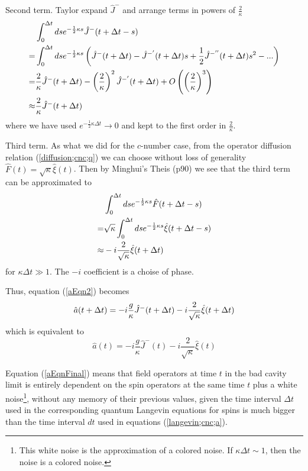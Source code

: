\documentclass{article}
\begin{document}
Second term. Taylor expand $\hat{J}^-$ and arrange terms in powers of $\frac{2}{\kappa}$
\begin{align}
\label{jMinusEli}
    \notag &\int_0^{\Delta t} ds e^{-\frac{1}{2}\kappa s}\hat{J}^-(t+\Delta t-s)\\
    \notag=&\int_0^{\Delta t} ds e^{-\frac{1}{2}\kappa s}\left(\hat{J}^-(t+\Delta t)-\hat{J}^{-'}(t+\Delta t)s+\frac{1}{2}\hat{J}^{-''}(t+\Delta t)s^2-...\right)\\
    \notag=&\frac{2}{\kappa}\hat{J}^-(t+\Delta t)-\left(\frac{2}{\kappa}\right)^2\hat{J}^{-'}(t+\Delta t)+O\left(\left(\frac{2}{\kappa}\right)^3\right)\\
          \approx&\frac{2}{\kappa}\hat{J}^-(t+\Delta t)
\end{align}
where we have used $e^{-\frac{1}{2}\kappa \Delta t}\rightarrow 0$ and kept to the first order in $\frac{2}{\kappa}$.

Third term. As what we did for the $c$-number case, from the operator diffusion relation (\ref{diffusion;cnc;q}) we can choose without loss of generality $\hat{F}(t) = \sqrt{\kappa}\hat{\xi}(t)$. Then by Minghui's Theis (p90) we see that the third term can be approximated to
\begin{align}
    \notag &\int_0^{\Delta t} ds e^{-\frac{1}{2}\kappa s} \hat{F}(t+\Delta t-s)\\
    \notag=&\sqrt{\kappa}\int_0^{\Delta t} ds e^{-\frac{1}{2}\kappa s} \hat{\xi}(t+\Delta t-s)\\
          \approx&-i\frac{2}{\sqrt{\kappa}}\hat{\xi}(t+\Delta t)
\end{align}
for $\kappa \Delta t \gg 1$. The $-i$ coefficient is a choise of phase.

Thus, equation (\ref{aEqn2}) becomes
\begin{equation}
    \notag\hat{a}(t+\Delta t) = -i\frac{g}{\kappa}\hat{J}^-(t+\Delta t)-i\frac{2}{\sqrt{\kappa}}\hat{\xi}(t+\Delta t)
\end{equation}
which is equivalent to 
\begin{equation}
    \label{aEqnFinal}
    \hat{a}(t) = -i\frac{g}{\kappa}\hat{J}^-(t)-i\frac{2}{\sqrt{\kappa}}\hat{\xi}(t)
\end{equation}

Equation (\ref{aEqnFinal}) means that field operators at time $t$ in the bad cavity limit is entirely dependent on the spin operators at the same time $t$ plus a white noise\footnote{This white noise is the approximation of a colored noise. If $\kappa \Delta t \sim 1$, then the noise is a colored noise.}, without any memory of their previous values, given the time interval $\Delta t$ used in the corresponding quantum Langevin equations for spins is much bigger than the time interval $dt$ used in equations (\ref{langevin;cnc;a}). 
\end{document}
